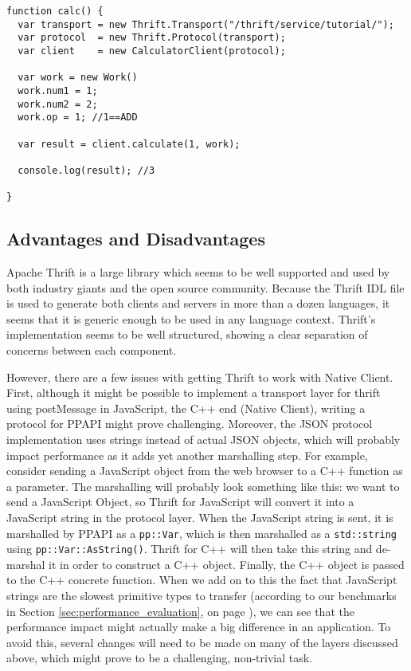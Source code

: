 \begin{lstlisting}
function calc() {
  var transport = new Thrift.Transport("/thrift/service/tutorial/");
  var protocol  = new Thrift.Protocol(transport);
  var client    = new CalculatorClient(protocol);

  var work = new Work()
  work.num1 = 1;
  work.num2 = 2;
  work.op = 1; //1==ADD

  var result = client.calculate(1, work);

  console.log(result); //3
  
}
\end{lstlisting}


\subsection{Advantages and Disadvantages} %
\label{sub:thrift_advantages_and_disadvantages}
Apache Thrift is a large library which seems to be well supported and used by both industry giants and the open source community. Because the Thrift IDL file is used to generate both clients and servers in more than a dozen languages, it seems that it is generic enough to be used in any language context. Thrift's implementation seems to be well structured, showing a clear separation of concerns between each component. 

However, there are a few issues with getting Thrift to work with Native Client. First, although it might be possible to implement a transport layer for thrift using postMessage in JavaScript, the C++ end (Native Client), writing a protocol for PPAPI might prove challenging. Moreover, the JSON protocol implementation uses strings instead of actual JSON objects, which will probably impact performance as it adds yet another marshalling step. For example, consider sending a JavaScript object from the web browser to a C++ function as a parameter. The marshalling will probably look something like this: we want to send a JavaScript Object, so Thrift for JavaScript will convert it into a JavaScript string in the protocol layer. When the JavaScript string is sent, it is marshalled by PPAPI as a \lstinline{pp::Var}, which is then marshalled as a \lstinline{std::string} using \lstinline{pp::Var::AsString()}. Thrift for C++ will then take this string and de-marshal it in order to construct a C++ object. Finally, the C++ object is passed to the C++ concrete function. When we add on to this the fact that JavaScript strings are the slowest primitive types to transfer (according to our benchmarks in Section \ref{sec:performance_evaluation}, on page \pageref{sec:performance_evaluation}), we can see that the performance impact might actually make a big difference in an application. To avoid this, several changes will need to be made on many of the layers discussed above, which might prove to be a challenging, non-trivial task.

